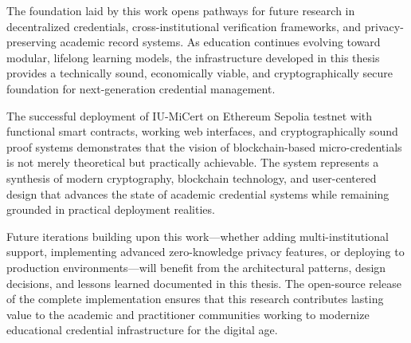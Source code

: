 The foundation laid by this work opens pathways for future research in decentralized credentials, cross-institutional verification frameworks, and privacy-preserving academic record systems. As education continues evolving toward modular, lifelong learning models, the infrastructure developed in this thesis provides a technically sound, economically viable, and cryptographically secure foundation for next-generation credential management.

The successful deployment of IU-MiCert on Ethereum Sepolia testnet with functional smart contracts, working web interfaces, and cryptographically sound proof systems demonstrates that the vision of blockchain-based micro-credentials is not merely theoretical but practically achievable. The system represents a synthesis of modern cryptography, blockchain technology, and user-centered design that advances the state of academic credential systems while remaining grounded in practical deployment realities.

Future iterations building upon this work—whether adding multi-institutional support, implementing advanced zero-knowledge privacy features, or deploying to production environments—will benefit from the architectural patterns, design decisions, and lessons learned documented in this thesis. The open-source release of the complete implementation ensures that this research contributes lasting value to the academic and practitioner communities working to modernize educational credential infrastructure for the digital age.
